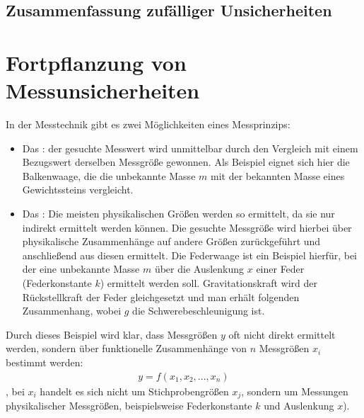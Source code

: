 \documentclass[letterpaper,10pt,english]{jupyterBook}
\begin{document}
\subsection{Zusammenfassung zufälliger Unsicherheiten}
\label{\detokenize{content/1_Mittelwert_StdAbw:zusammenfassung-zufalliger-unsicherheiten}}
\sphinxAtStartPar
{}

\sphinxstepscope


\section{Fortpflanzung von Messunsicherheiten}
\label{\detokenize{content/1_Fehlerfortpflanzung:fortpflanzung-von-messunsicherheiten}}\label{\detokenize{content/1_Fehlerfortpflanzung::doc}}
\sphinxAtStartPar
In der Messtechnik gibt es zwei Möglichkeiten eines Messprinzips:
\begin{itemize}
\item {} 
\sphinxAtStartPar
Das : der gesuchte Messwert wird unmittelbar durch den Vergleich mit einem Bezugswert derselben Messgröße gewonnen. Als Beispiel eignet sich hier die Balkenwaage, die die unbekannte Masse \(m\) mit der bekannten Masse eines Gewichtssteins vergleicht.

\item {} 
\sphinxAtStartPar
Das : Die meisten physikalischen Größen werden so ermittelt, da sie nur indirekt ermittelt werden können. Die gesuchte Messgröße wird hierbei über physikalische Zusammenhänge auf andere Größen zurückgeführt und anschließend aus diesen ermittelt. Die Federwaage ist ein Beispiel hierfür, bei der eine unbekannte Masse \(m\) über die Auslenkung \(x\) einer Feder (Federkonstante \(k\)) ermittelt werden soll. Gravitationskraft wird der Rückstellkraft der Feder gleichgesetzt und man erhält folgenden Zusammenhang, wobei \(g\) die Schwerebeschleunigung ist.

\end{itemize}

\sphinxAtStartPar
{}

\sphinxAtStartPar
Durch dieses Beispiel wird klar, dass Messgrößen \(y\) oft nicht direkt ermittelt werden, sondern über funktionelle Zusammenhänge von \(n\) Messgrößen \(x_i\) bestimmt werden:
\begin{equation*}
\begin{split} y = f(x_1, x_2, ...,x_n)\end{split}
\end{equation*}
\sphinxAtStartPar
{}, bei \(x_i\) handelt es sich nicht um Stichprobengrößen \(x_j\), sondern um  Messungen  physikalischer Messgrößen, beispielsweise Federkonstante \(k\) und Auslenkung \(x\)).
\end{document}
